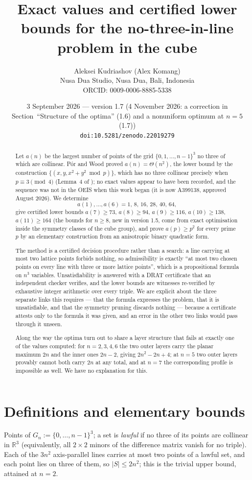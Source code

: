 \documentclass[11pt,a4paper]{article}
\title{Exact values and certified lower bounds for the no-three-in-line problem in the cube}
\author{Aleksei Kudriashov (Alex Komang)\\ \small Nusa Dua Studio, Nusa Dua, Bali, Indonesia\\ \small ORCID: 0009-0006-8885-5338}
\date{3 September 2026 --- version 1.7 (4 November 2026: a correction in Section~``Structure of the optima'' (1.6) and a nonuniform optimum at $n=5$ (1.7))\\ \small\texttt{doi:10.5281/zenodo.22019279}}
\begin{document}
\maketitle
\begin{abstract}
Let $a(n)$ be the largest number of points of the grid $\{0,1,\dots,n-1\}^3$ no three of which are collinear.
P\'or and Wood proved $a(n)=\Theta(n^2)$, the lower bound by the construction
$\{(x,y,x^2+y^2\bmod p)\}$, which has no three collinear precisely when $p\equiv3\pmod4$
(Lemma~4 of \cite{PorWood}); no exact values appear to have been recorded, and the sequence was not in
the OEIS when this work began (it is now A399138, approved August 2026).  We determine
\[a(1),\dots,a(6)=1,\,8,\,16,\,28,\,40,\,64,\]
give certified lower bounds $a(7)\ge73$, $a(8)\ge94$, $a(9)\ge116$, $a(10)\ge138$, $a(11)\ge164$ (the bounds for $n\ge8$,
new in version 1.5, come from exact optimisation inside the symmetry classes of the cube group), and prove $a(p)\ge p^2$ for every prime $p$ by an
elementary construction from an anisotropic binary quadratic form.

The method is a certified decision procedure rather than a search: a line carrying at most two lattice points
forbids nothing, so admissibility is exactly ``at most two chosen points on every line with three or more
lattice points'', which is a propositional formula on $n^3$ variables.  Unsatisfiability is answered with a
DRAT certificate that an independent checker verifies, and the lower bounds are witnesses re-verified by
exhaustive integer arithmetic over every triple.  We are explicit about the three separate links this
requires --- that the formula expresses the problem, that it is unsatisfiable, and that the symmetry pruning
discards nothing --- because a certificate attests only to the formula it was given, and an error in the other
two links would pass through it unseen.

Along the way the optima turn out to share a layer structure that fails at exactly one of the values computed:
for $n=2,3,4,6$ the two outer layers carry the planar maximum $2n$ and the inner ones $2n-2$, giving
$2n^2-2n+4$; at $n=5$ two outer layers provably cannot both carry $2n$ at any total, and at $n=7$ the
corresponding profile is impossible as well.  We have no explanation for this.
\end{abstract}

\section{Definitions and elementary bounds}
Points of $G_n:=\{0,\dots,n-1\}^3$; a set is \emph{lawful} if no three of its points are collinear in
$\mathbb R^3$ (equivalently, all $2\times2$ minors of the difference matrix vanish for no triple).
Each of the $3n^2$ axis-parallel lines carries at most two points of a lawful set, and each point lies on
three of them, so $|S|\le 2n^2$; this is the trivial upper bound, attained at $n=2$.
\end{document}
